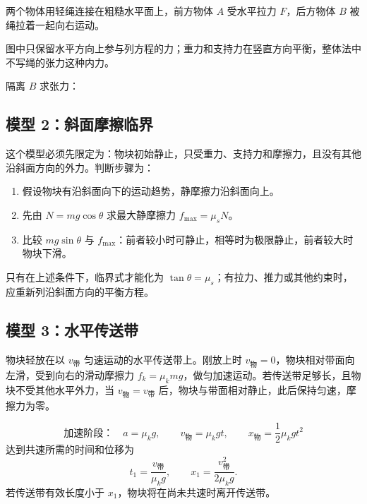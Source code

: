 两个物体用轻绳连接在粗糙水平面上，前方物体 $A$ 受水平拉力 $F$，后方物体 $B$ 被绳拉着一起向右运动。

\begin{center}


\label{fig:connected-body}
\end{center}

\noindent 图中只保留水平方向上参与列方程的力；重力和支持力在竖直方向平衡，整体法中不写绳的张力这种内力。

\noindent 隔离 $B$ 求张力：
\begin{center}


\label{fig:isolated-body}
\end{center}

\subsection*{模型 2：斜面摩擦临界}

这个模型必须先限定为：物块初始静止，只受重力、支持力和摩擦力，且没有其他沿斜面方向的外力。判断步骤为：
\begin{enumerate}
  \item 假设物块有沿斜面向下的运动趋势，静摩擦力沿斜面向上。
  \item 先由 $N=mg\cos\theta$ 求最大静摩擦力 $f_{\max}=\mu_sN$。
  \item 比较 $mg\sin\theta$ 与 $f_{\max}$：前者较小时可静止，相等时为极限静止，前者较大时物块下滑。
\end{enumerate}
只有在上述条件下，临界式才能化为 $\tan\theta=\mu_s$；有拉力、推力或其他约束时，应重新列沿斜面方向的平衡方程。

\subsection*{模型 3：水平传送带}

物块轻放在以 $v_{\text{带}}$ 匀速运动的水平传送带上。刚放上时
$v_{\text{物}}=0$，物块相对带面向左滑，受到向右的滑动摩擦力
$f_k=\mu_kmg$，做匀加速运动。若传送带足够长，且物块不受其他水平外力，当
$v_{\text{物}}=v_{\text{带}}$ 后，物块与带面相对静止，此后保持匀速，摩擦力为零。

\[
\text{加速阶段：}\quad
a=\mu_kg,\qquad
v_{\text{物}}=\mu_kgt,\qquad
x_{\text{物}}=\frac12\mu_kgt^2
\]
达到共速所需的时间和位移为
\[
t_1=\frac{v_{\text{带}}}{\mu_kg},
\qquad
x_1=\frac{v_{\text{带}}^2}{2\mu_kg}.
\]
若传送带有效长度小于 $x_1$，物块将在尚未共速时离开传送带。

